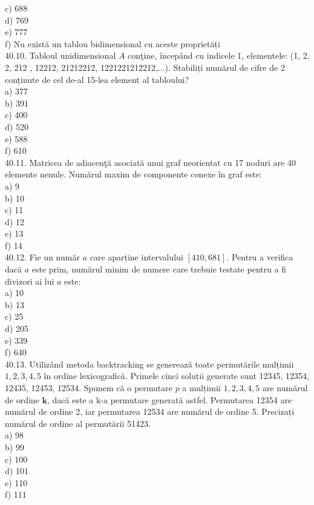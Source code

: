 \begin{itemize}
\begin{enumerate}
c) 688
\\
d) 769
\\
e) 777
\\
f) Nu există un tablou bidimensional cu aceste proprietăți
\\
40.10. Tabloul unidimensional $A$ conţine, începând cu indicele 1, elementele: (1, 2, 2, 212 , 12212, 21212212, 1221221212212,...). Stabiliți numărul de cifre de 2 conținute de cel de-al 15-lea element al tabloului?
\\
a) 377
\\
b) 391
\\
c) 400
\\
d) 520
\\
e) 588
\\
f) 610
\\
40.11. Matricea de adiacenţă asociată unui graf neorientat cu 17 noduri are 40 elemente nenule. Numărul maxim de componente conexe în graf este:
\\
a) 9
\\
b) 10
\\
c) 11
\\
d) 12
\\
e) 13
\\
f) 14
\\
40.12. Fie un număr $a$ care aparține intervalului $[410,681]$. Pentru a verifica dacă $a$ este prim, numărul minim de numere care trebuie testate pentru a fi divizori ai lui $a$ este:
\\
a) 10
\\
b) 13
\\
c) 25
\\
d) 205
\\
e) 339
\\
f) 640
\\
40.13. Utilizând metoda backtracking se generează toate permutările mulțimii ${1,2,3,4,5}$ în ordine lexicografică. Primele cinci soluții generate sunt 12345, 12354, 12435, 12453, 12534. Spunem că o permutare $p$ a mulțimii ${1,2,3,4,5}$ are numărul de ordine $\mathbf{k}$, dacă este a k-a permutare generată astfel. Permutarea 12354 are numărul de ordine 2, iar permutarea 12534 are numărul de ordine 5. Precizați numărul de ordine al permutării 51423.
\\
a) 98
\\
b) 99
\\
c) 100
\\
d) 101
\\
e) 110
\\
f) 111
\\

\end{enumerate}
\end{itemize}
